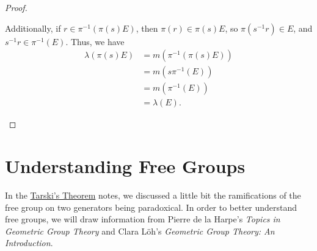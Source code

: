 \documentclass[10pt]{mypackage}
\begin{document}
\begin{proof}
\begin{enumerate}[(1)]
      Additionally, if $r\in \pi^{-1}\left(\pi\left(s\right)E\right)$, then $\pi\left(r\right) \in \pi\left(s\right)E $, so $\pi\left(s^{-1}r\right)\in E$, and $s^{-1}r\in \pi^{-1}\left(E\right)$. Thus, we have
      \begin{align*}
        \lambda\left(\pi\left(s\right)E\right) &= m\left(\pi^{-1}\left(\pi\left(s\right)E\right)\right)\\
                                               &= m\left(s\pi^{-1}\left(E\right)\right)\\
                                               &= m\left(\pi^{-1}\left(E\right)\right)\\
                                               &= \lambda\left(E\right).
      \end{align*}
      
  \end{enumerate}
\end{proof}
\section{Understanding Free Groups}%
In the \href{https://blog.avinashiyer.xyz/Classes_and_Homework/College/Y4/Honors\%20Thesis/amenability_notes.pdf}{Tarski's Theorem} notes, we discussed a little bit the ramifications of the free group on two generators being paradoxical. In order to better understand free groups, we will draw information from Pierre de la Harpe's \textit{Topics in Geometric Group Theory} and Clara Löh's \textit{Geometric Group Theory: An Introduction}.
\end{document}
